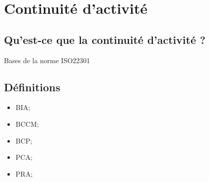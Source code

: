 
\section{Continuité d'activité}
\subsection{Qu’est-ce que la continuité d’activité ?}
Bases de la norme ISO22301
\subsection{Définitions}
\begin{itemize}
    \item BIA;
    \item BCCM;
    \item BCP;
    \item PCA;
    \item PRA;
\end{itemize}

